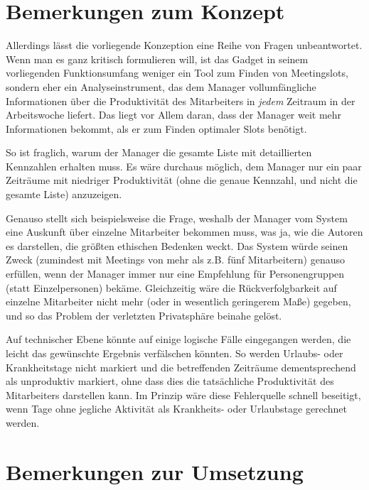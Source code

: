 \documentclass[oneside,12pt,a4paper,fleqn]{article}
\begin{document}
\section{Bemerkungen zum Konzept}

Allerdings lässt die vorliegende Konzeption eine Reihe von Fragen unbeantwortet. Wenn man es ganz kritisch formulieren will, ist das Gadget in seinem vorliegenden Funktionsumfang weniger ein Tool zum Finden von Meetingslots, sondern eher ein Analyseinstrument, das dem Manager vollumfängliche Informationen über die Produktivität des Mitarbeiters in \emph{jedem} Zeitraum in der Arbeitswoche liefert. Das liegt vor Allem daran, dass der Manager weit mehr Informationen bekommt, als er zum Finden optimaler Slots benötigt.

\medskip

So ist fraglich, warum der Manager die gesamte Liste mit detaillierten Kennzahlen erhalten muss. Es wäre durchaus möglich, dem Manager nur ein paar Zeiträume mit niedriger Produktivität (ohne die genaue Kennzahl, und nicht die gesamte Liste) anzuzeigen.

\medskip

Genauso stellt sich beispielsweise die Frage, weshalb der Manager vom System eine Auskunft über einzelne Mitarbeiter bekommen muss, was ja, wie die Autoren es darstellen, die größten ethischen Bedenken weckt. Das System würde seinen Zweck (zumindest mit Meetings von mehr als z.B. fünf Mitarbeitern) genauso erfüllen, wenn der Manager immer nur eine Empfehlung für Personengruppen (statt Einzelpersonen) bekäme. Gleichzeitig wäre die Rückverfolgbarkeit auf einzelne Mitarbeiter nicht mehr (oder in wesentlich geringerem Maße) gegeben, und so das Problem der verletzten Privatsphäre beinahe gelöst.

\medskip

Auf technischer Ebene könnte auf einige logische Fälle eingegangen werden, die leicht das gewünschte Ergebnis verfälschen könnten. So werden Urlaubs- oder Krankheitstage nicht markiert und die betreffenden Zeiträume dementsprechend als unproduktiv markiert, ohne dass dies die tatsächliche Produktivität des Mitarbeiters darstellen kann. Im Prinzip wäre diese Fehlerquelle schnell beseitigt, wenn Tage ohne jegliche Aktivität als Krankheits- oder Urlaubstage gerechnet werden.


\section{Bemerkungen zur Umsetzung}
\end{document}
